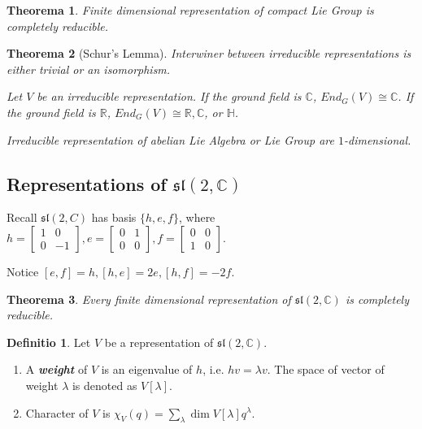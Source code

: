 \documentclass[12pt, a4paper]{article}
\newtheorem{theorem}{Theorema}[section]
\theoremstyle{definition}
\newtheorem{definition}{Definitio}[section]
\theoremstyle{remark}
\newcommand{\bb}[1]{\mathbb{#1}}
\renewcommand{\emph}[1]{\textbf{\textit{#1}}}
\renewcommand{\sl}{\mathfrak{sl}}
\begin{document}
\begin{theorem}
	Finite dimensional representation of compact Lie Group is completely reducible.
\end{theorem}

\begin{theorem}[Schur's Lemma]
	Interwiner between irreducible representations is either trivial or an isomorphism.
	
	Let $V$ be an irreducible representation. 
	If the ground field is $\bb{C}$, $End_G(V) \cong \bb{C}$.
	If the ground field is $\bb{R}$, $End_G(V) \cong \bb{R}, \bb{C}$, or $\bb{H}$.

	Irreducible representation of abelian Lie Algebra or Lie Group are $1$-dimensional.
\end{theorem}

\subsection{Representations of $\sl(2, \bb{C})$}

Recall $\sl(2, C)$ has basis $\{h, e, f\}$, where 
$h = \begin{bmatrix}
	1 & 0 \\
	0 & -1
	\end{bmatrix}, 
e = \begin{bmatrix}
	0 & 1 \\ 
	0 & 0 
	\end{bmatrix}, 
f = \begin{bmatrix} 
	0 & 0 \\ 
	1 & 0 
\end{bmatrix}$.

Notice $[e,f] = h, [h,e] = 2e, [h,f]=-2f$.

\begin{theorem}
	Every finite dimensional representation of $\sl(2, \bb{C})$ is completely reducible.
\end{theorem} 

\begin{definition}
	Let $V$ be a representation of $\sl(2, \bb{C})$. 
	\begin{enumerate}
		\item A \emph{weight} of $V$ is an eigenvalue of $h$, i.e. $hv = \lambda v$. The space of vector of weight $\lambda$ is denoted as $V[\lambda]$.
		\item Character of $V$ is $\chi_V(q) = \sum_{\lambda} \dim V[\lambda]q^{\lambda}$.
	\end{enumerate}
\end{definition}
\end{document}
